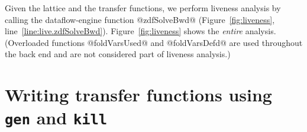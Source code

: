 \documentclass[blockstyle,preprint,natbib,nocopyrightspace]{sigplanconf}
\newcommand\lineref[1]{line~\ref{line:#1}}
\newcommand{\authornote}[1]{{\em #1}}
\def\authornote#1{\unskip\relax}
\newcommand{\simon}[1]{\authornote{SLPJ: #1}}
\newcommand{\norman}[1]{\authornote{NR: #1}}
\let\remark\norman
\newcommand\seclabel[1]{\label{sec:#1}}
\newcommand\figref[1]{Figure~\ref{fig:#1}}
\begin{document}
Given the lattice and the transfer functions,
we perform liveness analysis by calling
the dataflow-engine function @zdfSolveBwd@ (\figref{liveness},
\lineref{live.zdfSolveBwd}). 
\figref{liveness} shows the \emph{entire} analysis.
(Overloaded functions
@foldVarsUsed@ and @foldVarsDefd@
are used throughout the back end and
are not considered part of liveness analysis.)
\simon{I still want to see their type signatures in a figure somewhere!!
Plus any other non-obvious functions we use but do not define.}
%



\ifgenkill
\section{Writing transfer functions using {\mdseries\texttt{gen}} and
{\mdseries\texttt{kill}}}



\seclabel{gen-kill}

\simon{I'd make this into a sub-section of Section 4.  
It's not important enough to deserve a section to itself.}
\end{document}

